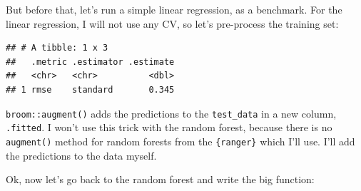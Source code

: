 \documentclass[]{gitbook}
\newenvironment{Shaded}{\begin{snugshade}}{\end{snugshade}}
\newcommand{\DataTypeTok}[1]{\textcolor[rgb]{0.13,0.29,0.53}{#1}}
\newcommand{\KeywordTok}[1]{\textcolor[rgb]{0.13,0.29,0.53}{\textbf{#1}}}
\newcommand{\NormalTok}[1]{#1}
\newcommand{\OperatorTok}[1]{\textcolor[rgb]{0.81,0.36,0.00}{\textbf{#1}}}
\newcommand{\StringTok}[1]{\textcolor[rgb]{0.31,0.60,0.02}{#1}}
\begin{document}
But before that, let's run a simple linear regression, as a benchmark. For the linear regression, I will
not use any CV, so let's pre-process the training set:

\begin{Shaded}
\end{Shaded}

\begin{verbatim}
## # A tibble: 1 x 3
##   .metric .estimator .estimate
##   <chr>   <chr>          <dbl>
## 1 rmse    standard       0.345
\end{verbatim}

\texttt{broom::augment()} adds the predictions to the \texttt{test\_data} in a new column, \texttt{.fitted}. I won't
use this trick with the random forest, because there is no \texttt{augment()} method for random forests
from the \texttt{\{ranger\}} which I'll use. I'll add the predictions to the data myself.

Ok, now let's go back to the random forest and write the big function:
\end{document}
